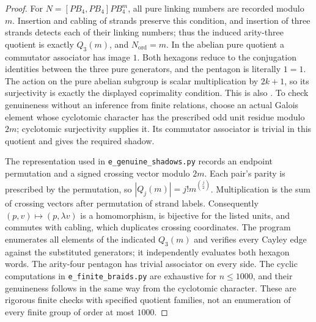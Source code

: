\begin{proof}
For $N=[PB_4,PB_4]PB_4^m$, all pure linking numbers are recorded
modulo $m$.  Insertion and cabling of strands preserve this condition,
and insertion of three strands detects each of their linking numbers;
thus the induced arity-three quotient is exactly $Q_3(m)$, and
$N_{\mathrm{ord}}=m$.  In the abelian pure quotient a commutator
associator has image $1$.  Both hexagons reduce to the conjugation
identities between the three pure generators, and the pentagon is
literally $1=1$.  The action on the pure abelian subgroup is scalar
multiplication by $2k+1$, so its surjectivity is exactly the displayed
coprimality condition.  This is also
\citet[Theorem~B.2]{DolgushevLeLorenz2024}.  To check genuineness
without an inference from finite relations, choose an actual Galois
element whose cyclotomic character has the prescribed odd unit
residue modulo $2m$; cyclotomic surjectivity supplies it.  Its
commutator associator is trivial in this quotient and gives the
required shadow.

The representation used in \texttt{e\_genuine\_shadows.py} records an
endpoint permutation and a signed crossing vector modulo $2m$.
Each pair's parity is prescribed by the permutation, so
$|Q_j(m)|=j!m^{\binom j2}$.  Multiplication is the sum of crossing
vectors after permutation of strand labels.  Consequently
$(p,v)\mapsto(p,\lambda v)$ is a homomorphism, is bijective for the
listed units, and commutes with cabling, which duplicates crossing
coordinates.  The program enumerates all elements of the indicated
$Q_3(m)$ and verifies every Cayley edge against the substituted
generators; it independently evaluates both hexagon words.
The arity-four pentagon has trivial associator on every side.
The cyclic computations in \texttt{e\_finite\_braids.py} are exhaustive
for $n\leq1000$, and their genuineness follows in the same way from
the cyclotomic character.  These are rigorous finite checks with
specified quotient families, not an enumeration of every finite
group of order at most $1000$.
\end{proof}

